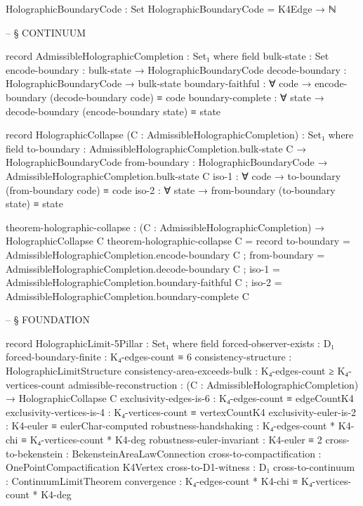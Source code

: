 \documentclass[11pt,a4paper]{book}
\begin{document}
\begin{code}
HolographicBoundaryCode : Set
HolographicBoundaryCode = K4Edge → ℕ


-- § CONTINUUM

record AdmissibleHolographicCompletion : Set₁ where
  field
    bulk-state      : Set
    encode-boundary : bulk-state → HolographicBoundaryCode
    decode-boundary : HolographicBoundaryCode → bulk-state
    boundary-faithful : ∀ code → encode-boundary (decode-boundary code) ≡ code
    boundary-complete : ∀ state → decode-boundary (encode-boundary state) ≡ state

record HolographicCollapse (C : AdmissibleHolographicCompletion) : Set₁ where
  field
    to-boundary   : AdmissibleHolographicCompletion.bulk-state C → HolographicBoundaryCode
    from-boundary : HolographicBoundaryCode → AdmissibleHolographicCompletion.bulk-state C
    iso-1         : ∀ code → to-boundary (from-boundary code) ≡ code
    iso-2         : ∀ state → from-boundary (to-boundary state) ≡ state

theorem-holographic-collapse : (C : AdmissibleHolographicCompletion) → HolographicCollapse C
theorem-holographic-collapse C = record
  { to-boundary = AdmissibleHolographicCompletion.encode-boundary C
  ; from-boundary = AdmissibleHolographicCompletion.decode-boundary C
  ; iso-1 = AdmissibleHolographicCompletion.boundary-faithful C
  ; iso-2 = AdmissibleHolographicCompletion.boundary-complete C
  }


-- § FOUNDATION

record HolographicLimit-5Pillar : Set₁ where
  field
    forced-observer-exists        : D₁
    forced-boundary-finite        : K₄-edges-count ≡ 6
    consistency-structure         : HolographicLimitStructure
    consistency-area-exceeds-bulk : K₄-edges-count ≥ K₄-vertices-count
    admissible-reconstruction     : (C : AdmissibleHolographicCompletion) → HolographicCollapse C
    exclusivity-edges-is-6        : K₄-edges-count ≡ edgeCountK4
    exclusivity-vertices-is-4     : K₄-vertices-count ≡ vertexCountK4
    exclusivity-euler-is-2        : K4-euler ≡ eulerChar-computed
    robustness-handshaking        : K₄-edges-count * K4-chi ≡ K₄-vertices-count * K4-deg
    robustness-euler-invariant    : K4-euler ≡ 2
    cross-to-bekenstein           : BekensteinAreaLawConnection
    cross-to-compactification     : OnePointCompactification K4Vertex
    cross-to-D1-witness           : D₁
    cross-to-continuum            : ContinuumLimitTheorem
    convergence                   : K₄-edges-count * K4-chi ≡ K₄-vertices-count * K4-deg


\end{code}
\end{document}
